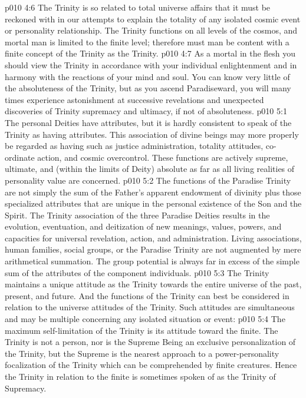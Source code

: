 \vs p010 4:6 \pc The Trinity is so related to total universe affairs that it must be reckoned with in our attempts to explain the totality of any isolated cosmic event or personality relationship. The Trinity functions on all levels of the cosmos, and mortal man is limited to the finite level; therefore must man be content with a finite concept of the Trinity as the Trinity.
\vs p010 4:7 As a mortal in the flesh you should view the Trinity in accordance with your individual enlightenment and in harmony with the reactions of your mind and soul. You can know very little of the absoluteness of the Trinity, but as you ascend Paradiseward, you will many times experience astonishment at successive revelations and unexpected discoveries of Trinity supremacy and ultimacy, if not of absoluteness.
\vs p010 5:1 The personal Deities have attributes, but it is hardly consistent to speak of the Trinity as having attributes. This association of divine beings may more properly be regarded as having  such as justice administration, totality attitudes, co\hyp{}ordinate action, and cosmic overcontrol. These functions are actively supreme, ultimate, and (within the limits of Deity) absolute as far as all living realities of personality value are concerned.
\vs p010 5:2 The functions of the Paradise Trinity are not simply the sum of the Father’s apparent endowment of divinity plus those specialized attributes that are unique in the personal existence of the Son and the Spirit. The Trinity association of the three Paradise Deities results in the evolution, eventuation, and deitization of new meanings, values, powers, and capacities for universal revelation, action, and administration. Living associations, human families, social groups, or the Paradise Trinity are not augmented by mere arithmetical summation. The group potential is always far in excess of the simple sum of the attributes of the component individuals.
\vs p010 5:3 \pc The Trinity maintains a unique attitude as the Trinity towards the entire universe of the past, present, and future. And the functions of the Trinity can best be considered in relation to the universe attitudes of the Trinity. Such attitudes are simultaneous and may be multiple concerning any isolated situation or event:
\vs p010 5:4 \pc {}\bibnobreakspace {} The maximum self\hyp{}limitation of the Trinity is its attitude toward the finite. The Trinity is not a person, nor is the Supreme Being an exclusive personalization of the Trinity, but the Supreme is the nearest approach to a power\hyp{}personality focalization of the Trinity which can be comprehended by finite creatures. Hence the Trinity in relation to the finite is sometimes spoken of as the Trinity of Supremacy.
